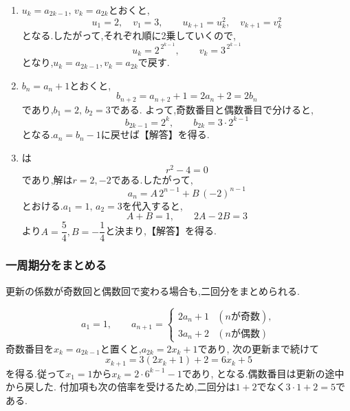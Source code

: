 \noindent{}\par\nobreak
\begin{enumerate}[label=(\arabic*),parsep=3pt,format=\bookitemlink{example-nonadjacent-1}{solution}{problem}]
  \item $u_k=a_{2k-1},\,v_k=a_{2k}$とおくと,
    \[
      u_1=2,\quad v_1=3,\qquad
      u_{k+1}=u_k^2,\quad v_{k+1}=v_k^2
    \]
    となる.したがって,それぞれ順に2乗していくので,
    \[
      u_k=2^{\,2^{k-1}},\qquad v_k=3^{\,2^{k-1}}
    \]
    となり,$u_k=a_{2k-1},v_k=a_{2k}$で戻す.
  \item $b_n=a_n+1$とおくと,
    \[
      b_{n+2}=a_{n+2}+1=2a_n+2=2b_n
    \]
    であり,$b_1=2,\,b_2=3$である.
    よって,奇数番目と偶数番目で分けると,
    \[
      b_{2k-1}=2^k,\qquad b_{2k}=3\cdot2^{k-1}
    \]
    となる.$a_n=b_n-1$に戻せば【解答】を得る.
  \item {}は
    \[
      r^2-4=0
    \]
    であり,解は$r=2,-2$である.したがって,
    \[
      a_n=A\,2^{n-1}+B\,(-2)^{n-1}
    \]
    とおける.$a_1=1,\,a_2=3$を代入すると,
    \[
      A+B=1,\qquad 2A-2B=3
    \]
    より$A=\dfrac{5}{4},B=-\dfrac{1}{4}$と決まり,【解答】を得る.
\end{enumerate}

\subsubsection{一周期分をまとめる}\label{節：一周期分をまとめる}
更新の係数が奇数回と偶数回で変わる場合も,二回分をまとめられる.

\[
  a_1=1,\qquad
  a_{n+1}=\begin{cases}
    2a_n+1&(n\text{が奇数}),\\
    3a_n+2&(n\text{が偶数})
  \end{cases}
\]
奇数番目を$x_k=a_{2k-1}$と置くと,$a_{2k}=2x_k+1$であり,
次の更新まで続けて
\[
  x_{k+1}=3(2x_k+1)+2=6x_k+5
\]
を得る.従って$x_1=1$から$x_k=2\cdot6^{k-1}-1$であり,
\BookMathLayout{\[
    a_{2k-1}=2\cdot6^{k-1}-1,\qquad
    a_{2k}=4\cdot6^{k-1}-1\quad(k\ge1)
  \]}{\[
    \begin{aligned}
      a_{2k-1}&=2\cdot6^{k-1}-1,\\
      a_{2k}&=4\cdot6^{k-1}-1\quad(k\ge1)
    \end{aligned}
  \]}
となる.偶数番目は更新の途中から戻した.
付加項も次の倍率を受けるため,二回分は$1+2$でなく$3\cdot1+2=5$である.

